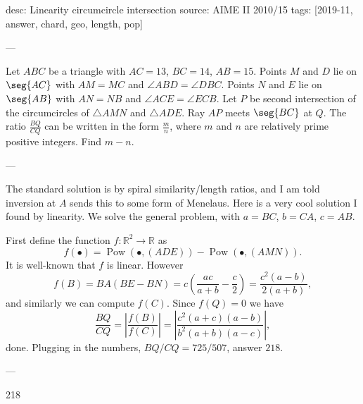 desc: Linearity circumcircle intersection
source: AIME II 2010/15
tags: [2019-11, answer, chard, geo, length, pop]

---

Let $ABC$ be a triangle with $AC=13$, $BC=14$, $AB=15$. Points $M$ and $D$ lie on $\seg{AC}$ with $AM=MC$ and $\angle ABD=\angle DBC$. Points $N$ and $E$ lie on $\seg{AB}$ with $AN=NB$ and $\angle ACE=\angle ECB$. Let $P$ be second intersection of the circumcircles of $\triangle AMN$ and $\triangle ADE$. Ray $AP$ meets $\seg{BC}$ at $Q$. The ratio $\frac{BQ}{CQ}$ can be written in the form $\frac mn$, where $m$ and $n$ are relatively prime positive integers. Find $m-n$.

---

The standard solution is by spiral similarity/length ratios, and I am told inversion at $A$ sends this to some form of Menelaus. Here is a very cool solution I found by linearity. We solve the general problem, with $a=BC$, $b=CA$, $c=AB$. 

First define the function $f:\mathbb R^2\to\mathbb R$ as \[f(\bullet)=\operatorname{Pow}(\bullet,(ADE))-\operatorname{Pow}(\bullet,(AMN)).\]
It is well-known that $f$ is linear. However \[f(B)=BA(BE-BN)=c\left(\frac{ac}{a+b}-\frac c2\right)=\frac{c^2(a-b)}{2(a+b)},\]
and similarly we can compute $f(C)$. Since $f(Q)=0$ we have \[\frac{BQ}{CQ}=\left|\frac{f(B)}{f(C)}\right|=\left|\frac{c^2(a+c)(a-b)}{b^2(a+b)(a-c)}\right|,\]
done. Plugging in the numbers, $BQ/CQ=725/507$, answer $218$.

---

218

